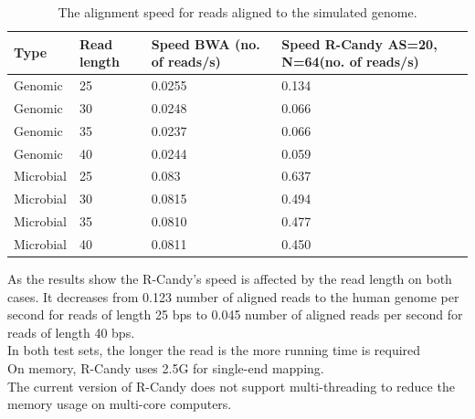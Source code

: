 \documentclass[11pt,a4paper]{report}
\begin{document}
\begin{table}[h]
  \begin{tabular}{ |  p{2cm} | p{2cm} | p{3cm} | p{3cm} | }
    \hline
  	\textbf{Type} & \textbf{Read length }&\textbf{Speed BWA \hspace{35pt}(no. of reads/s) } 	 
  	& \textbf{Speed R-Candy AS=20, N=64\hspace{35pt}(no. of reads/s)}\\ \hline
  
      Genomic   & 25  & 0.0255  &  0.134 \\ \hline 
      Genomic   & 30  & 0.0248  &  0.066 \\ \hline 
 	  Genomic	& 35  & 0.0237  &  0.066 \\ \hline 
 	  Genomic	& 40  & 0.0244  &  0.059 \\ \hline 
 	  Microbial & 25  & 0.083   &  0.637 \\ \hline 
      Microbial & 30  & 0.0815  &  0.494 \\ \hline 
 	  Microbial & 35  & 0.0810  &  0.477 \\ \hline 
 	  Microbial & 40  & 0.0811  &  0.450 \\ \hline 
 	  
   \end{tabular}
\caption{The alignment speed for reads aligned to the simulated genome.}
\label{speed-SG}
\end{table}



As the results  show  the R-Candy's speed is affected by the read length on both cases.
It decreases from 0.123 number of aligned reads to the human genome per second for reads 
of length 25 bps to 0.045 number of aligned reads per second for reads of length 40 bps. \\
In both test sets, the longer the read is the more running time is required\\

On memory, R-Candy uses 2.5G for single-end mapping.\\

The current version of R-Candy does not support multi-threading to reduce the 
memory usage on multi-core computers.\\\\




\end{document}
